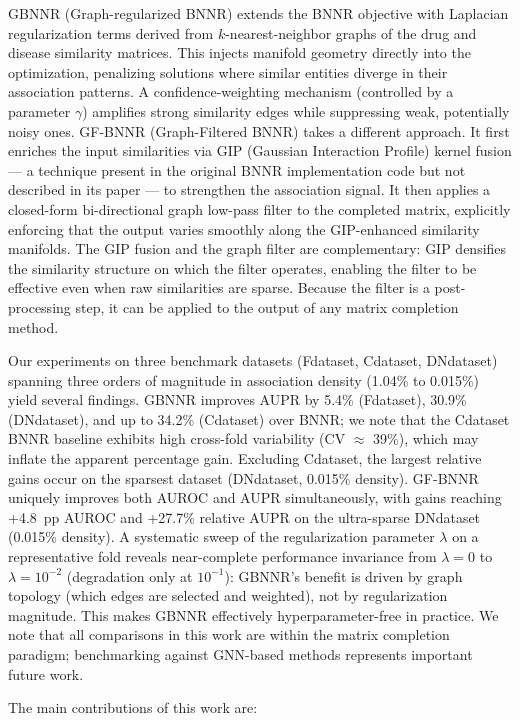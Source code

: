\documentclass[unnumsec,webpdf,contemporary,large]{oup-authoring-template}
\begin{document}
GBNNR (Graph-regularized BNNR) extends the BNNR objective with Laplacian regularization terms derived from $k$-nearest-neighbor graphs of the drug and disease similarity matrices. This injects manifold geometry directly into the optimization, penalizing solutions where similar entities diverge in their association patterns. A confidence-weighting mechanism (controlled by a parameter $\gamma$) amplifies strong similarity edges while suppressing weak, potentially noisy ones. GF-BNNR (Graph-Filtered BNNR) takes a different approach. It first enriches the input similarities via GIP (Gaussian Interaction Profile) kernel fusion --- a technique present in the original BNNR implementation code but not described in its paper --- to strengthen the association signal. It then applies a closed-form bi-directional graph low-pass filter to the completed matrix, explicitly enforcing that the output varies smoothly along the GIP-enhanced similarity manifolds. The GIP fusion and the graph filter are complementary: GIP densifies the similarity structure on which the filter operates, enabling the filter to be effective even when raw similarities are sparse. Because the filter is a post-processing step, it can be applied to the output of any matrix completion method.

Our experiments on three benchmark datasets (Fdataset, Cdataset, DNdataset) spanning three orders of magnitude in association density (1.04\% to 0.015\%) yield several findings. GBNNR improves AUPR by 5.4\% (Fdataset), 30.9\% (DNdataset), and up to 34.2\% (Cdataset) over BNNR; we note that the Cdataset BNNR baseline exhibits high cross-fold variability (CV $\approx$ 39\%), which may inflate the apparent percentage gain. Excluding Cdataset, the largest relative gains occur on the sparsest dataset (DNdataset, 0.015\% density). GF-BNNR uniquely improves both AUROC and AUPR simultaneously, with gains reaching +4.8~pp AUROC and +27.7\% relative AUPR on the ultra-sparse DNdataset (0.015\% density). A systematic sweep of the regularization parameter $\lambda$ on a representative fold reveals near-complete performance invariance from $\lambda = 0$ to $\lambda = 10^{-2}$ (degradation only at $10^{-1}$): GBNNR's benefit is driven by graph topology (which edges are selected and weighted), not by regularization magnitude. This makes GBNNR effectively hyperparameter-free in practice. We note that all comparisons in this work are within the matrix completion paradigm; benchmarking against GNN-based methods represents important future work.

The main contributions of this work are:
\end{document}
